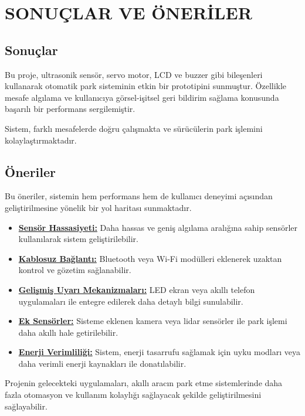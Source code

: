 \section{SONUÇLAR VE ÖNERİLER}
\subsection{Sonuçlar}

    Bu proje, ultrasonik sensör, servo motor, LCD ve buzzer gibi bileşenleri kullanarak otomatik park sisteminin etkin bir prototipini sunmuştur. Özellikle mesafe algılama ve kullanıcıya görsel-işitsel geri bildirim sağlama konusunda başarılı bir performans sergilemiştir.

    Sistem, farklı mesafelerde doğru çalışmakta ve sürücülerin park işlemini kolaylaştırmaktadır.

\subsection{Öneriler}
    Bu öneriler, sistemin hem performans hem de kullanıcı deneyimi açısından geliştirilmesine yönelik bir yol haritası sunmaktadır.
\begin{itemize}
\item \textbf{\underline{Sensör Hassasiyeti:}}  Daha hassas ve geniş algılama aralığına sahip sensörler kullanılarak sistem geliştirilebilir.

\item \textbf{\underline{Kablosuz Bağlantı:}} Bluetooth veya Wi-Fi modülleri eklenerek uzaktan kontrol ve gözetim sağlanabilir.

\item \textbf{\underline{Gelişmiş Uyarı Mekanizmaları:}}  LED ekran veya akıllı telefon uygulamaları ile entegre edilerek daha detaylı bilgi sunulabilir.

\item \textbf{\underline{Ek Sensörler:}} Sisteme eklenen kamera veya lidar sensörler ile park işlemi daha akıllı hale getirilebilir.

\item \textbf{\underline{Enerji Verimliliği:}} Sistem, enerji tasarrufu sağlamak için uyku modları veya daha verimli enerji kaynakları ile donatılabilir.
\end{itemize}

    Projenin gelecekteki uygulamaları, akıllı aracın park etme sistemlerinde daha fazla otomasyon ve kullanım kolaylığı sağlayacak şekilde geliştirilmesini sağlayabilir.

